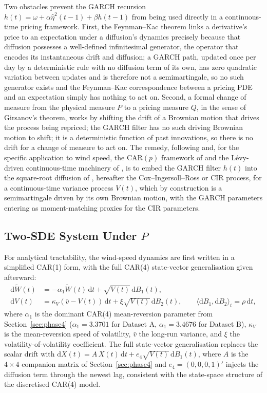 Two obstacles prevent the GARCH recursion $h(t) = \omega + \alpha\hat\eta^2(t-1) + \beta h(t-1)$ from being used directly in a continuous-time pricing framework. First, the Feynman--Kac theorem links a derivative's price to an expectation under a diffusion's dynamics precisely because that diffusion possesses a well-defined infinitesimal generator, the operator that encodes its instantaneous drift and diffusion; a GARCH path, updated once per day by a deterministic rule with no diffusion term of its own, has zero quadratic variation between updates and is therefore not a semimartingale, so no such generator exists and the Feynman--Kac correspondence between a pricing PDE and an expectation simply has nothing to act on. Second, a formal change of measure from the physical measure $P$ to a pricing measure $Q$, in the sense of Girsanov's theorem, works by shifting the drift of a Brownian motion that drives the process being repriced; the GARCH filter has no such driving Brownian motion to shift; it is a deterministic function of past innovations, so there is no drift for a change of measure to act on. The remedy, following \citet{Heston1993} and, for the specific application to wind speed, the CAR$(p)$ framework of \citet{BenthSaltyteBenth2009} and the Lévy-driven continuous-time machinery of \citet{BrockwellMarquardt2005}, is to embed the GARCH filter $h(t)$ into the square-root diffusion of \citet{CoxIngersollRoss1985}, hereafter the Cox--Ingersoll--Ross or CIR process, for a continuous-time variance process $V(t)$, which by construction is a semimartingale driven by its own Brownian motion, with the GARCH parameters entering as moment-matching proxies for the CIR parameters.

\subsection{Two-SDE System Under $P$}
\label{sec:phase5-sde}

For analytical tractability, the wind-speed dynamics are first written in a simplified CAR(1) form, with the full CAR(4) state-vector generalisation given afterward:
\begin{align}
\mathrm d\widetilde W(t) &= -\alpha_1 \widetilde W(t)\, \mathrm dt + \sqrt{V(t)}\, \mathrm dB_1(t), \\
\mathrm dV(t) &= \kappa_V(\bar v - V(t))\, \mathrm dt + \xi \sqrt{V(t)}\, \mathrm dB_2(t), \qquad \langle \mathrm dB_1, \mathrm dB_2\rangle_t = \rho\, \mathrm dt,
\end{align}
where $\alpha_1$ is the dominant CAR(4) mean-reversion parameter from Section~\ref{sec:phase4} ($\alpha_1 = 3.3701$ for Dataset A, $\alpha_1 = 3.4676$ for Dataset B), $\kappa_V$ is the mean-reversion speed of volatility, $\bar v$ the long-run variance, and $\xi$ the volatility-of-volatility coefficient. The full state-vector generalisation replaces the scalar drift with $\mathrm dX(t) = A\, X(t)\, \mathrm dt + e_4 \sqrt{V(t)}\, \mathrm dB_1(t)$, where $A$ is the $4\times4$ companion matrix of Section~\ref{sec:phase4} and $e_4 = (0,0,0,1)'$ injects the diffusion term through the newest lag, consistent with the state-space structure of the discretised CAR(4) model.

